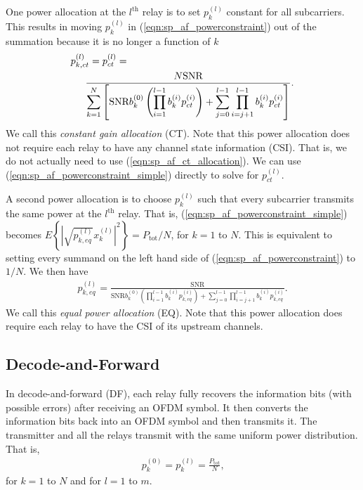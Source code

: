 \documentclass[conference]{IEEEtran}
\begin{document}
One power allocation at the $l^{\mbox{th}}$ relay is to set $p_k^{(l)}$ constant for all subcarriers.  This results in moving $p_k^{(l)}$ in (\ref{eqn:sp_af_powerconstraint}) out of the summation because it is no longer a function of $k$
\begin{eqnarray}
p_{k,ct}^{(l)} = p_{ct}^{(l)} =  \hspace{2.35in} \nonumber \\
\frac{ N \mbox{SNR} } { \displaystyle \sum_{k=1}^N \left[
\mbox{SNR} b_k^{(0)} \left( \displaystyle \prod_{i=1}^{l-1}
b_k^{(i)} p_{ct}^{(i)}\right) + \displaystyle \sum_{j=0}^{l-1}
\displaystyle \prod_{i=j+1}^{l-1} b_k^{(i)} p_{ct}^{(i)} \right]}.
\label{eqn:sp_af_ct_allocation}
\end{eqnarray}
We call this \emph{constant gain allocation} (CT).  Note that this
power allocation does not require each relay to have any channel
state information (CSI).  That is, we do not actually need to use
(\ref{eqn:sp_af_ct_allocation}).  We can use
(\ref{eqn:sp_af_powerconstraint_simple}) directly to solve for
$p_{ct}^{(l)}$.

A second power allocation is to choose $p_k^{(l)}$ such that every subcarrier transmits the same power at the $l^{\mbox{th}}$ relay.  That is, (\ref{eqn:sp_af_powerconstraint_simple}) becomes $E \left\{ \left| \sqrt{p_{k,eq}^{(l)}} x_k^{(l)} \right| ^2 \right\} = P_{\mbox{tot}}/N$, for $k = 1$ to $N$.  This is equivalent to setting every summand on the left hand side of (\ref{eqn:sp_af_powerconstraint}) to $1/N$.  We then have
\begin{eqnarray}
p_{k,eq}^{(l)} = \frac{\mbox{SNR}}
{\mbox{SNR} b_k^{(0)} \left( \displaystyle\prod_{i=1}^{l-1}b_k^{(i)} p_{k,eq}^{(i)} \right) + \displaystyle\sum_{j=0}^{l-1}
\prod_{i=j+1}^{l-1}  b_k^{(i)} p_{k,eq}^{(i)}} \mbox{.}
\label{}
\end{eqnarray}
We call this \emph{equal power allocation} (EQ).  Note that this power allocation does require each relay to have the CSI of its upstream channels.

\subsection{Decode-and-Forward}
In decode-and-forward (DF), each relay fully recovers the information bits (with possible errors) after receiving an OFDM symbol.  It then converts the information bits back into an OFDM symbol and then transmits it.  The transmitter and all the relays transmit with the same uniform power distribution.  That is,
\begin{eqnarray}
p_k^{(0)} = p_k^{(l)} = \frac{P_{\mbox{tot}}}{N}\mbox{,}
\end{eqnarray}
for $k = 1$ to $N$ and for $l = 1$ to $m$.
\end{document}

